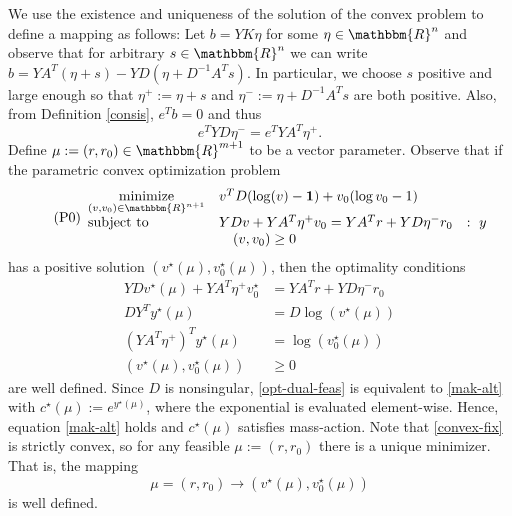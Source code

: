 \documentclass[smallextended]{svjour3}       %
\newcommand*{\0}{\mathbf{0}}
\newcommand*{\1}{\mathbf{1}}
\newcommand*{\minimize}{\text{minimize}}
\newcommand*{\st}{\text{subject to}}
\newcommand*{\R}{\mathbbm{R}}
\begin{document}
We use the existence and uniqueness of the solution of the convex problem 
to define a mapping as follows: Let $b=YK\eta$ for some $\eta \in \R^n$ and observe
that for arbitrary $s \in \R^n$ we can write $b = YA^T(\eta +s) - YD(\eta +
D^{-1}A^Ts)$.  In particular, we choose $s$ positive and large enough so
that $\eta^+ := \eta+s$ and $\eta^- := \eta + D^{-1}A^Ts$ are both positive.
Also, from Definition \ref{consis}, $e^Tb = 0$ and thus
\begin{equation}
  e^TYD\eta^- = e^TYA^T\eta^+.
  \label{massbalanceb}
\end{equation}
Define $\mu:=(r,r_0) \in \R^{m+1}$ to be a vector parameter.  Observe that if
the parametric convex optimization problem
\begin{equation}
  \tag{P0}
	\begin{array}{lll}
  \underset{(v,v_0)\in\R^{n+1}}{\minimize} & v^T D(\log(v)-\1) + v_0(\log v_0 -1) \\
	\st &  YD v + YA^T\eta^+ v_0 = YA^Tr + YD\eta^-r_0 &:\ y \\
	    &\quad (v,v_0) \ge 0                     
	\end{array}
	\label{convex-fix}
\end{equation}
has a positive solution $(v^\star(\mu),v_0^\star(\mu))$, then the optimality
conditions
\begin{subequations}
    \label{opt-cond}
	\begin{align}
      YDv^\star(\mu)  + YA^T\eta^+ v^\star_0  &= YA^Tr + YD\eta^-r_0  \label{opt-primal-feas}\\
      DY^T y^\star(\mu) &= D\log(v^\star(\mu))                        \label{opt-dual-feas}\\
      (YA^T\eta^+)^Ty^\star(\mu)   &= \log(v^\star_0(\mu))            \label{opt-dual-feas-two}\\
    (v^\star(\mu),v_0^\star(\mu)) &\ge 0                              \label{opt-primal-bounds}
	\end{align}
\end{subequations}
are well defined. Since $D$ is nonsingular, \eqref{opt-dual-feas} is
equivalent to \eqref{mak-alt} with $c^\star(\mu) := e^{y^\star(\mu)}$, where
the exponential is evaluated element-wise.  Hence, equation \eqref{mak-alt} holds
and $c^\star(\mu)$ satisfies mass-action. Note that 
\eqref{convex-fix} is strictly convex, so for any feasible $\mu:=(r,r_0)$ there is 
a unique minimizer. That is, the mapping 
\begin{equation}
  \mu=(r,r_0) \rightarrow (v^\star(\mu),v^\star_0(\mu))
  \label{mapping}
\end{equation} 
is well defined.
\end{document}
